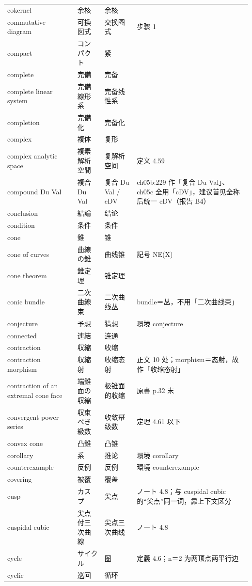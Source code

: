 \begin{longtable}{@{}>{\raggedright\arraybackslash}p{}>{\raggedright\arraybackslash}p{}>{\raggedright\arraybackslash}p{}>{\raggedright\arraybackslash}p{}@{}}
cokernel & 余核 & 余核 &  \\
commutative diagram & 可換図式 & 交换图式 & 3.31 步骤 1 \\
compact & コンパクト & 紧 &  \\
complete & 完備 & 完备 &  \\
complete linear system & 完備線形系 & 完备线性系 &  \\
completion & 完備化 & 完备化 &  \\
complex & 複体 & 复形 &  \\
complex analytic space & 複素解析空間 & 复解析空间 & 定义 4.59 \\
compound Du Val & 複合 Du Val & 复合 Du Val / cDV & ch05b:229 作「复合 Du Val」、ch05c 全用「cDV」，建议首见全称后统一 cDV（报告 B4） \\
conclusion & 結論 & 结论 &  \\
condition & 条件 & 条件 &  \\
cone & 錐 & 锥 &  \\
cone of curves & 曲線の錐 & 曲线锥 & 記号 NE(X) \\
cone theorem & 錐定理 & 锥定理 &  \\
conic bundle & 二次曲線束 & 二次曲线丛 & bundle＝丛，不用「二次曲线束」 \\
conjecture & 予想 & 猜想 & 環境 conjecture \\
connected & 連結 & 连通 &  \\
contraction & 収縮 & 收缩 &  \\
contraction morphism & 収縮射 & 收缩态射 & 正文 10 处；morphism＝态射，故作「收缩态射」 \\
contraction of an extremal cone face & 端錐面の収縮 & 极锥面的收缩 & 原書 p.32 末 \\
convergent power series & 収束べき級数 & 收敛幂级数 & 定理 4.61 以下 \\
convex cone & 凸錐 & 凸锥 &  \\
corollary & 系 & 推论 & 環境 corollary \\
counterexample & 反例 & 反例 & 環境 counterexample \\
covering & 被覆 & 覆盖 &  \\
cusp & カスプ & 尖点 & ノート 4.8；与 cuspidal cubic 的“尖点”同一词，靠上下文区分 \\
cuspidal cubic & 尖点付三次曲線 & 尖点三次曲线 & ノート 4.8 \\
cycle & サイクル & 圈 & 定義 4.6；n＝2 为两顶点两平行边 \\
cyclic & 巡回 & 循环 &  \\

\end{longtable}
